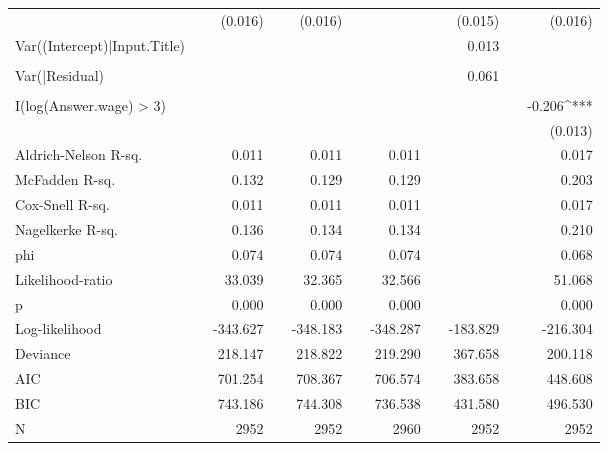 \begin{tabular}{lcD{.}{.}{7}cD{.}{.}{7}cD{.}{.}{7}cD{.}{.}{7}cD{.}{.}{7}}
                             &  &  (0.016)     &&  (0.016)     &&              &&  (0.015)     &&  (0.016)    \\
Var((Intercept)|Input.Title) &  &              &&              &&              &&   0.013      &&             \\
                             &  &              &&              &&              &&              &&             \\
Var(|Residual)               &  &              &&              &&              &&   0.061      &&             \\
                             &  &              &&              &&              &&              &&             \\
I(log(Answer.wage) > 3)      &  &              &&              &&              &&              && -0.206^{***}\\
                             &  &              &&              &&              &&              &&  (0.013)    \\
\midrule
Aldrich-Nelson R-sq.         &  &      0.011   &&      0.011   &&      0.011   &&              &&      0.017  \\
McFadden R-sq.               &  &      0.132   &&      0.129   &&      0.129   &&              &&      0.203  \\
Cox-Snell R-sq.              &  &      0.011   &&      0.011   &&      0.011   &&              &&      0.017  \\
Nagelkerke R-sq.             &  &      0.136   &&      0.134   &&      0.134   &&              &&      0.210  \\
phi                          &  &      0.074   &&      0.074   &&      0.074   &&              &&      0.068  \\
Likelihood-ratio             &  &     33.039   &&     32.365   &&     32.566   &&              &&     51.068  \\
p                            &  &      0.000   &&      0.000   &&      0.000   &&              &&      0.000  \\
Log-likelihood               &  &   -343.627   &&   -348.183   &&   -348.287   &&   -183.829   &&   -216.304  \\
Deviance                     &  &    218.147   &&    218.822   &&    219.290   &&    367.658   &&    200.118  \\
AIC                          &  &    701.254   &&    708.367   &&    706.574   &&    383.658   &&    448.608  \\
BIC                          &  &    743.186   &&    744.308   &&    736.538   &&    431.580   &&    496.530  \\
N                            &  &   2952       &&   2952       &&   2960       &&   2952       &&   2952      \\
\bottomrule
\end{tabular}
